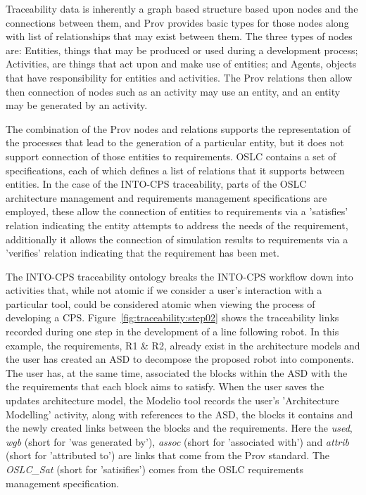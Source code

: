 Traceability data is inherently a graph based structure based upon nodes and the connections between them, and Prov provides basic types for those nodes along with list of relationships that may exist between them.  The three types of nodes are: Entities, things that may be produced or used during a development process; Activities, are things that act upon and make use of entities; and Agents, objects that have responsibility for entities and activities.  The Prov relations then allow then connection of nodes such as an activity may use an entity, and an entity may be generated by an activity.  

The combination of the Prov nodes and relations supports the representation of the processes that lead to the generation of a particular entity, but it does not support connection of those entities to requirements.  OSLC contains a set of specifications, each of which defines a list of relations that it supports between entities. In the case of the INTO-CPS traceability, parts of the OSLC architecture management and requirements management specifications are employed, these allow the connection of entities to requirements via a 'satisfies' relation indicating the entity attempts to address the needs of the requirement, additionally it allows the connection of simulation results to requirements via a 'verifies' relation indicating that the requirement has been met.


The INTO-CPS traceability ontology breaks the INTO-CPS workflow down into activities that, while not atomic if we consider a user's interaction with a particular tool, could be considered atomic when viewing the process of developing a CPS.  Figure~\ref{fig:traceability:step02} shows the traceability links recorded during one step in the development of a line following robot.  In this example, the requirements, R1 \& R2, already exist in the architecture models and the user has created an ASD to decompose the proposed robot into components.  The user has, at the same time, associated the blocks within the ASD with the the requirements that each block aims to satisfy.  When the user saves the updates architecture model, the Modelio tool records the user's 'Architecture Modelling' activity, along with references to the ASD, the blocks it contains and the newly created links between the blocks and the requirements.  Here the \emph{used}, \emph{wgb} (short for 'was generated by'), \emph{assoc} (short for 'associated with') and \emph{attrib} (short for 'attributed to') are links that come from the Prov standard.  The \emph{OSLC\_Sat} (short for 'satisifies') comes from the OSLC requirements management specification.

